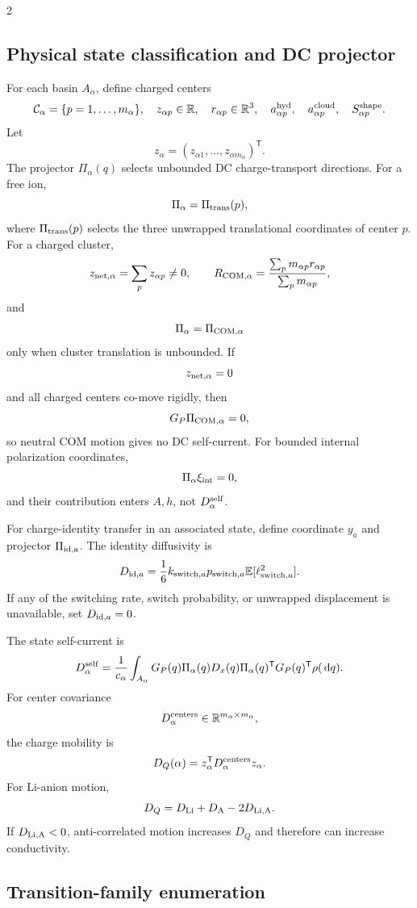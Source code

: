 \documentclass[10pt]{article}
\newcommand{\dd}{\,\mathrm d}
\newcommand{\R}{\mathbb{R}}
\newcommand{\T}{\mathsf{T}}
\begin{document}
\begin{multicols}{2}
\subsection{Physical state classification and DC projector}

For each basin \(A_\alpha\), define charged centers
\[
\mathcal C_\alpha=\{p=1,\ldots,m_\alpha\},
\quad
z_{\alpha p}\in\R,\quad r_{\alpha p}\in\R^3,\quad
a_{\alpha p}^{\rm hyd},\quad a_{\alpha p}^{\rm cloud},\quad
S_{\alpha p}^{\rm shape}.
\]
Let
\[
z_\alpha=(z_{\alpha1},\ldots,z_{\alpha m_\alpha})^\T.
\]
The projector \(\Pi_\alpha(q)\) selects unbounded DC charge-transport
directions. For a free ion,
\[
\Pi_\alpha=\Pi_{\rm trans}(p),
\]
where \(\Pi_{\rm trans}(p)\) selects the three unwrapped translational
coordinates of center \(p\). For a charged cluster,
\[
z_{\rm net,\alpha}=\sum_pz_{\alpha p}\ne0,
\qquad
R_{\rm COM,\alpha}
=
\frac{\sum_pm_{\alpha p}r_{\alpha p}}{\sum_pm_{\alpha p}},
\]
and
\[
\Pi_\alpha=\Pi_{\rm COM,\alpha}
\]
only when cluster translation is unbounded. If
\[
z_{\rm net,\alpha}=0
\]
and all charged centers co-move rigidly, then
\[
G_P\Pi_{\rm COM,\alpha}=0,
\]
so neutral COM motion gives no DC self-current. For bounded internal
polarization coordinates,
\[
\Pi_\alpha\xi_{\rm int}=0,
\]
and their contribution enters \(A,h\), not \(D_\alpha^{\rm self}\).

For charge-identity transfer in an associated state, define coordinate \(y_a\)
and projector \(\Pi_{\rm id,a}\). The identity diffusivity is
\[
D_{{\rm id},a}
=
\frac16
k_{{\rm switch},a}
p_{{\rm switch},a}
\mathbb E[\ell_{{\rm switch},a}^{2}].
\]
If any of the switching rate, switch probability, or unwrapped displacement is
unavailable, set \(D_{{\rm id},a}=0\).

The state self-current is
\[
D_\alpha^{\rm self}
=
\frac{1}{c_\alpha}
\int_{A_\alpha}
G_P(q)\Pi_\alpha(q)D_x(q)\Pi_\alpha(q)^\T
G_P(q)^\T\rho(\dd q).
\]
For center covariance
\[
D_\alpha^{\rm centers}\in\R^{m_\alpha\times m_\alpha},
\]
the charge mobility is
\[
D_Q(\alpha)=z_\alpha^\T D_\alpha^{\rm centers}z_\alpha.
\]
For Li-anion motion,
\[
D_Q=D_{\rm Li}+D_{\rm A}-2D_{\rm Li,A}.
\]
If \(D_{\rm Li,A}<0\), anti-correlated motion increases \(D_Q\) and therefore
can increase conductivity.

\subsection{Transition-family enumeration}


\end{multicols}
\end{document}
